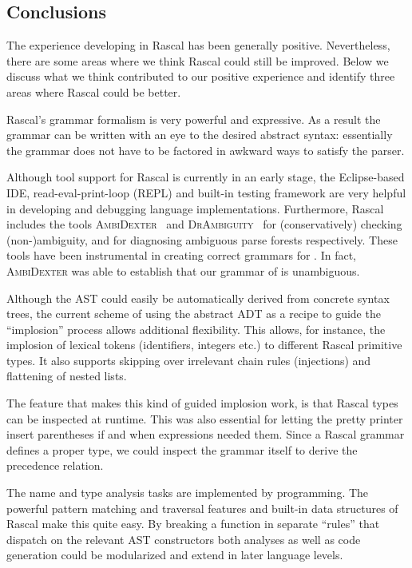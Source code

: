 \subsection{Conclusions}

\noindent The experience developing \oberon in Rascal has been generally positive. Nevertheless, there are some areas where we think Rascal could still be improved. Below we discuss what we think contributed to our positive experience and identify three areas where Rascal could be better.

Rascal's grammar formalism is very powerful and expressive. As a result the grammar can be written with an eye to the desired abstract syntax: essentially the grammar does not have to be factored in awkward ways to satisfy the parser.

Although tool support for Rascal is currently in an early stage, the Eclipse-based IDE, read-eval-print-loop (REPL) and built-in testing framework are very helpful in developing and debugging language implementations. Furthermore, Rascal includes the tools \textsc{AmbiDexter}~\cite{AmbiDexter} and \textsc{DrAmbiguity}~\cite{DrAmbiguity} for (conservatively) checking (non-)ambiguity, and for diagnosing ambiguous parse forests respectively. These tools have been instrumental in creating correct grammars for \oberon. In fact, \textsc{AmbiDexter} was able to establish that our grammar of \oberon is unambiguous.

Although the AST could easily be automatically derived from concrete syntax trees, the current scheme of using the abstract ADT as a recipe to guide the ``implosion'' process allows additional flexibility.  This allows, for instance, the implosion of lexical tokens (identifiers, integers etc.) to different Rascal primitive types. It also supports skipping over irrelevant chain rules (injections) and flattening of nested lists. 

The feature that makes this kind of guided implosion work, is that Rascal types can be inspected at runtime. This was also essential for letting the pretty printer insert parentheses if and when expressions needed them. Since a Rascal grammar defines a proper type, we could inspect the \oberon grammar itself to derive the precedence relation. 

The name and type analysis tasks are implemented by programming. The powerful pattern matching and traversal features and built-in data structures of Rascal make this quite easy. By breaking a function in separate ``rules'' that dispatch on the relevant AST constructors both analyses as well as code generation could be modularized and extend in later language levels.

